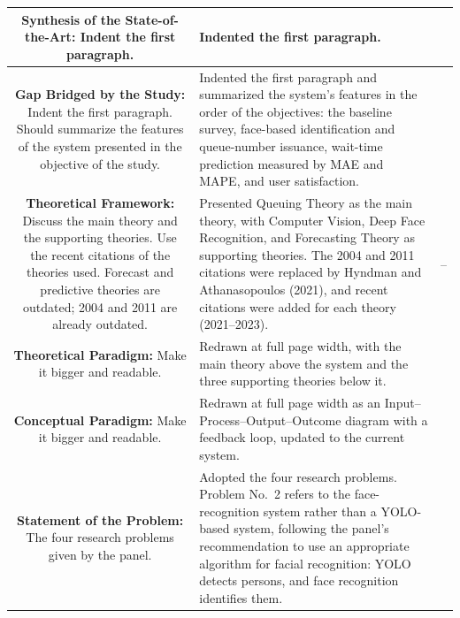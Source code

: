 \documentclass[12pt,letterpaper]{article}
\newcommand{\pg}[1]{\large #1}
\begin{document}
\begin{longtable}{|S|A|P|}
\textbf{Synthesis of the State-of-the-Art:}\newline
Indent the first paragraph.
&
Indented the first paragraph.
&
\pg{\pageref{cr:synthesis}} \\ \hline

\textbf{Gap Bridged by the Study:}\newline
Indent the first paragraph. Should summarize the features of the system
presented in the objective of the study.
&
Indented the first paragraph and summarized the system's features in
the order of the objectives: the baseline survey, face-based
identification and queue-number issuance, wait-time prediction measured
by MAE and MAPE, and user satisfaction.
&
\pg{\pageref{cr:gap}} \\ \hline

\textbf{Theoretical Framework:}\newline
Discuss the main theory and the supporting theories. Use the recent
citations of the theories used. Forecast and predictive theories are
outdated; 2004 and 2011 are already outdated.
&
Presented Queuing Theory as the main theory, with Computer Vision, Deep
Face Recognition, and Forecasting Theory as supporting theories. The
2004 and 2011 citations were replaced by Hyndman and Athanasopoulos
(2021), and recent citations were added for each theory (2021--2023).
&
\pg{\pageref{sec:theoretical}--\pageref{sec:conceptual-framework}} \\ \hline

\textbf{Theoretical Paradigm:}\newline
Make it bigger and readable.
&
Redrawn at full page width, with the main theory above the system and the
three supporting theories below it.
&
\pg{\pageref{fig:theoretical-framework}} \\ \hline

\textbf{Conceptual Paradigm:}\newline
Make it bigger and readable.
&
Redrawn at full page width as an Input--Process--Output--Outcome
diagram with a feedback loop, updated to the current system.
&
\pg{\pageref{fig:conceptual-framework}} \\ \hline

\textbf{Statement of the Problem:}\newline
The four research problems given by the panel.
&
Adopted the four research problems. Problem No.~2 refers to the
face-recognition system rather than a YOLO-based system, following the
panel's recommendation to use an appropriate algorithm for facial
recognition: YOLO detects persons, and face recognition identifies
them.
&
\pg{\pageref{cr:sop}} \\ \hline


\end{longtable}
\end{document}
